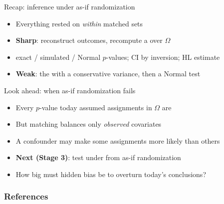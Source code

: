 \documentclass[table, xcolor = {dvipsnames}, 9pt]{beamer}
\theoremstyle{plain}
\newcommand{\mh}[1]{{\color{magenta}{#1}}}
\begin{document}
\begin{frame}[t]{Recap: inference under as-if randomization}
\vfill
\begin{itemize} \vfill
\item Everything rested on \mh{as-if randomization} \emph{within} matched sets \vfill
\item \textbf{Sharp}: reconstruct outcomes, recompute a \mh{sum statistic} over $\Omega$ \vfill
\item[] exact / simulated / Normal $p$-values; CI by inversion; HL estimate \vfill
\item \textbf{Weak}: the \mh{ATE} with a conservative variance, then a Normal test \vfill
\end{itemize} \vfill
\end{frame}
\begin{frame}[t]{Look ahead: when as-if randomization fails}
\vfill
\begin{itemize} \vfill
\item Every $p$-value today assumed assignments in $\Omega$ are \mh{equally likely} \vfill
\item But matching balances only \emph{observed} covariates \vfill
\item A \mh{hidden} confounder may make some assignments more likely than others \vfill
\item \textbf{Next (Stage 3)}: test under \mh{departures} from as-if randomization \vfill
\item[] How big must hidden bias be to overturn today's conclusions? \vfill
\end{itemize} \vfill
\end{frame}
\begin{frame}[allowframebreaks]
\frametitle{References}
\scriptsize


\end{frame}
\end{document}

